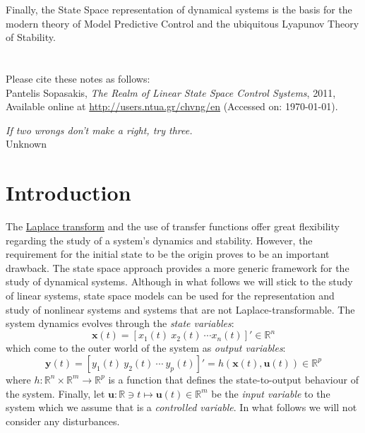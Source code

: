 \documentclass[a4paper,10pt,oneside]{book}
\begin{document}
Finally, the State Space representation of dynamical systems is the basis for the modern theory of Model Predictive Control and the ubiquitous Lyapunov Theory of Stability. \\
\\
\\
Please cite these notes as follows:\\
Pantelis Sopasakis, \emph{The Realm of Linear State Space Control Systems}, 2011, Available online at \href{http://users.ntua.gr/chvng/en/}{http://users.ntua.gr/chvng/en} (Accessed on: \today).


\thispagestyle{empty} %
\addtocounter{page}{-1} %
\vspace{2.5in} %
\begin{center} %
{
\emph{If two wrongs don't make a right, try three.}\\
Unknown
}

\end{center}


\tableofcontents
\chapter{Introduction}
The \href{http://en.wikipedia.org/wiki/Laplace_transform}{Laplace transform} and the use of transfer functions offer great flexibility regarding the study of a system's dynamics and stability. However, the requirement for the initial state to be the origin proves to be an important drawback. The state space approach provides a more generic framework for the study of dynamical systems. Although in what follows we will stick to the study of linear systems, state space models can be used for the representation and study of nonlinear systems and systems that are not Laplace-transformable. 
The system dynamics evolves through the \emph{state variables}:
\[\mathbf{x}(t)=[x_1(t)\ x_2(t)\ \cdots x_n(t)]'\in\mathbb{R}^n\] 
which come to the outer world of the system as \emph{output variables}: 
\[\mathbf{y}(t)=[y_1(t)\ y_2(t)\ \cdots\ y_p(t)]'=h(\mathbf{x}(t),\mathbf{u}(t))\in\mathbb{R}^p\]
where $h:\mathbb{R}^n\times\mathbb{R}^m\rightarrow\mathbb{R}^p$ is a function that defines the state-to-output behaviour of the system. Finally, let $\mathbf{u}:\mathbb{R}\ni t \mapsto \mathbf{u}(t)\in\mathbb{R}^m$ be the \emph{input variable} to the system which we assume that is a \emph{controlled variable}. In what follows we will not consider any disturbances. 
\end{document}
